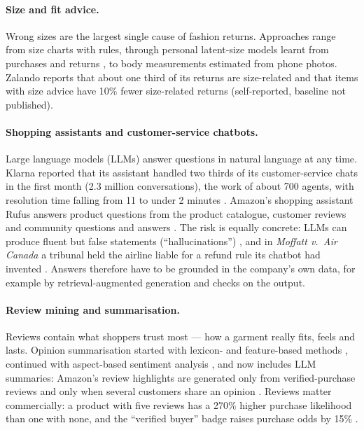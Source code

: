\paragraph{Size and fit advice.} Wrong sizes are the largest single cause of fashion returns. Approaches range from size charts with rules, through personal latent-size models learnt from purchases and returns \cite{sembium2017}, to body measurements estimated from phone photos. Zalando reports that about one third of its returns are size-related and that items with size advice have 10\% fewer size-related returns \cite{zalando_size} (self-reported, baseline not published).

\paragraph{Shopping assistants and customer-service chatbots.} Large language models (LLMs) answer questions in natural language at any time. Klarna reported that its assistant handled two thirds of its customer-service chats in the first month (2.3 million conversations), the work of about 700 agents, with resolution time falling from 11 to under 2 minutes \cite{klarna2024}. Amazon's shopping assistant Rufus answers product questions from the product catalogue, customer reviews and community questions and answers \cite{rufus2024}. The risk is equally concrete: LLMs can produce fluent but false statements (``hallucinations'') \cite{ji2023}, and in \emph{Moffatt v.\ Air Canada} a tribunal held the airline liable for a refund rule its chatbot had invented \cite{aircanada2024}. Answers therefore have to be grounded in the company's own data, for example by retrieval-augmented generation \cite{lewis2020} and checks on the output.

\paragraph{Review mining and summarisation.} Reviews contain what shoppers trust most --- how a garment really fits, feels and lasts. Opinion summarisation started with lexicon- and feature-based methods \cite{huliu2004}, continued with aspect-based sentiment analysis \cite{pontiki2014}, and now includes LLM summaries: Amazon's review highlights are generated only from verified-purchase reviews and only when several customers share an opinion \cite{amazon2023}. Reviews matter commercially: a product with five reviews has a 270\% higher purchase likelihood than one with none, and the ``verified buyer'' badge raises purchase odds by 15\% \cite{spiegel2017}.

